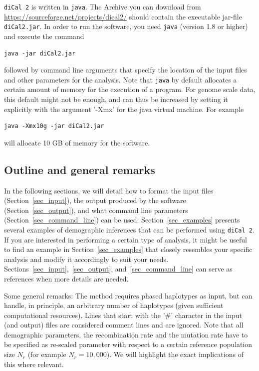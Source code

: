 \documentclass{article}
\numberwithin{equation}{section}
\begin{document}
\texttt{diCal 2} is written in \texttt{java}. The Archive you can download from \url{https://sourceforge.net/projects/dical2/} should contain the executable jar-file \texttt{diCal2.jar}. In order to run the software, you need \texttt{java} (version 1.8 or higher) and execute the command
\begin{verbatim}
java -jar diCal2.jar
\end{verbatim}
followed by command line arguments that specify the location of the input files and other parameters for the analysis. Note that \texttt{java} by default allocates a certain amount of memory for the execution of a program. For genome scale data, this default might not be enough, and can thus be increased by setting it explicitly with the argument '-Xmx' for the java virtual machine. For example
\begin{verbatim}
java -Xmx10g -jar diCal2.jar
\end{verbatim}
will allocate 10 GB of memory for the software.

\subsection{Outline and general remarks}

In the following sections, we will detail how to format the input files (Section~\ref{sec_input}), the output produced by the software (Section~\ref{sec_output}), and what command line parameters (Section~\ref{sec_command_line}) can be used. Section~\ref{sec_examples} presents several examples of demographic inferences that can be performed using \texttt{diCal 2}. If you are interested in performing a certain type of analysis, it might be useful to find an example in Section~\ref{sec_examples} that closely resembles your specific analysis and modify it accordingly to suit your needs. Sections~\ref{sec_input},~\ref{sec_output}, and~\ref{sec_command_line} can serve as references when more details are needed.

Some general remarks: The method requires phased haplotypes as input, but can handle, in principle, an arbitrary number of haplotypes (given sufficient computational resources). Lines that start with the '\#' character in the input (and output) files are considered comment lines and are ignored. Note that all demographic parameters, the recombination rate and the mutation rate have to be specified as re-scaled parameter with respect to a certain reference population size $N_r$ (for example $N_r = 10,000$). We will highlight the exact implications of this where relevant.
\end{document}

